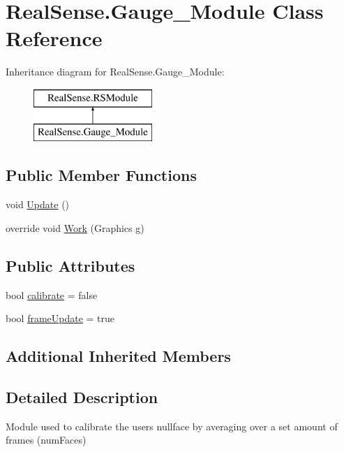 \hypertarget{class_real_sense_1_1_gauge___module}{}\section{Real\+Sense.\+Gauge\+\_\+\+Module Class Reference}
\label{class_real_sense_1_1_gauge___module}
Inheritance diagram for Real\+Sense.\+Gauge\+\_\+\+Module\+:\begin{figure}[H]
\begin{center}
\leavevmode
\includegraphics[height=2.000000cm]{class_real_sense_1_1_gauge___module}
\end{center}
\end{figure}
\subsection*{Public Member Functions}
\begin{DoxyCompactItemize}
\item 
void \hyperlink{class_real_sense_1_1_gauge___module_a367111d614ea2a05af81e93a3b957cd4}{Update} ()
\item 
override void \hyperlink{class_real_sense_1_1_gauge___module_a587ea68ad539f2f56bcfbd7641a92a83}{Work} (Graphics g)
\end{DoxyCompactItemize}
\subsection*{Public Attributes}
\begin{DoxyCompactItemize}
\item 
bool \hyperlink{class_real_sense_1_1_gauge___module_a116882e1610b28a8ce6159b1ddbbf578}{calibrate} = false
\item 
bool \hyperlink{class_real_sense_1_1_gauge___module_ae9d8d183234958600957fdfd23c4d850}{frame\+Update} = true
\end{DoxyCompactItemize}
\subsection*{Additional Inherited Members}


\subsection{Detailed Description}
Module used to calibrate the user\textquotesingle{}s nullface by averaging over a set amount of frames (num\+Faces)

